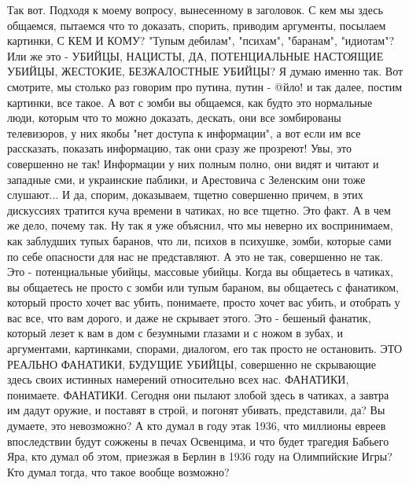 Так вот. Подходя к моему вопросу, вынесенному в заголовок. С кем мы здесь
общаемся, пытаемся что то доказать, спорить, приводим аргументы, посылаем
картинки, С КЕМ И КОМУ?  "Тупым дебилам", "психам", "баранам", "идиотам"? Или
же это - УБИЙЦЫ, НАЦИСТЫ, ДА, ПОТЕНЦИАЛЬНЫЕ НАСТОЯЩИЕ УБИЙЦЫ, ЖЕСТОКИЕ,
БЕЗЖАЛОСТНЫЕ УБИЙЦЫ? Я думаю именно так. Вот смотрите, мы столько раз говорим
про путина, путин - @йло! и так далее, постим картинки, все такое. А вот с
зомби вы общаемся, как будто это нормальные люди, которым что то можно
доказать, дескать, они все зомбированы телевизоров, у них якобы "нет доступа к
информации", а вот если им все рассказать, показать информацию, так они сразу
же прозреют! Увы, это совершенно не так!  Информации у них полным полно, они
видят и читают и западные сми, и украинские паблики, и Арестовича с Зеленским
они тоже слушают...  И да, спорим, доказываем, тщетно совершенно причем, в этих
дискуссиях тратится куча времени в чатиках, но все тщетно.  Это факт. А в чем
же дело, почему так. Ну так я уже объяснил, что мы неверно их воспринимаем, как
заблудших тупых баранов, что ли, психов в психушке, зомби, которые сами по себе
опасности для нас не представляют. А это не так, совершенно не так.  Это -
потенциальные убийцы, массовые убийцы. Когда вы общаетесь в чатиках, вы
общаетесь не просто с зомби или тупым бараном, вы общаетесь с фанатиком,
который просто хочет вас убить, понимаете, просто хочет вас убить, и отобрать у
вас все, что вам дорого, и даже не скрывает этого.  Это - бешеный фанатик,
который лезет к вам в дом с безумными глазами и с ножом в зубах, и аргументами,
картинками, спорами, диалогом, его так просто не остановить. ЭТО РЕАЛЬНО
ФАНАТИКИ, БУДУЩИЕ УБИЙЦЫ, совершенно не скрывающие здесь своих истинных
намерений относительно всех нас. ФАНАТИКИ, понимаете. ФАНАТИКИ. Сегодня они
пылают злобой здесь в чатиках, а завтра им дадут оружие, и поставят в строй, и
погонят убивать, представили, да? Вы думаете, это невозможно?  А кто думал в
году этак 1936, что миллионы евреев впоследствии будут сожжены в печах
Освенцима, и что будет трагедия Бабьего Яра, кто думал об этом, приезжая в
Берлин в 1936 году на Олимпийские Игры? Кто думал тогда, что такое вообще
возможно?



